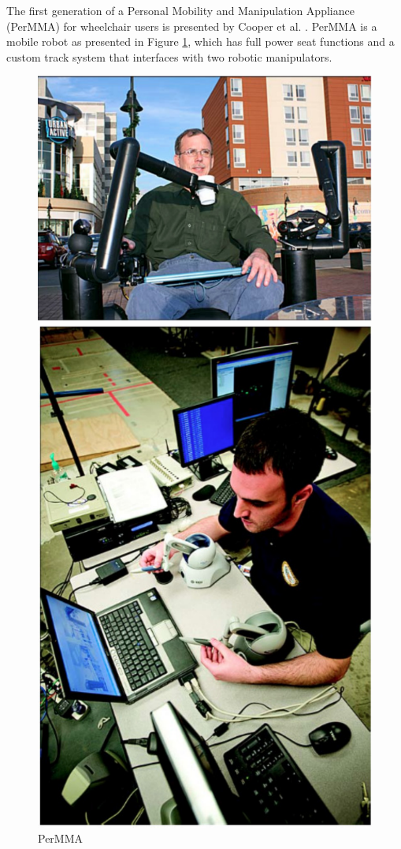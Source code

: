 The first generation of a Personal Mobility and Manipulation Appliance (PerMMA) for wheelchair users is presented by Cooper et al. \cite{cooper2012}.  PerMMA is a mobile robot as presented in Figure \ref{subfig:cooper2012-robotView}, which has full power seat functions and a custom track system that interfaces with two robotic manipulators. 

\begin{figure}[!htbp]
\center
\begin{minipage}{0.45\linewidth}
\center
\captionsetup{justification=centering,margin=0.5cm,font=small}
\includegraphics[width=1.1\linewidth]{img/cap3/cooper2012-robotView}
\caption{PerMMA \cite{cooper2012}} \label{subfig:cooper2012-robotView}
\end{minipage}
\begin{minipage}{0.45\linewidth}
\center
\captionsetup{justification=centering,margin=0cm,font=small}
\includegraphics[width=0.7\linewidth]{img/cap3/cooper2012-remoteOp}

\end{minipage}
\end{figure}
